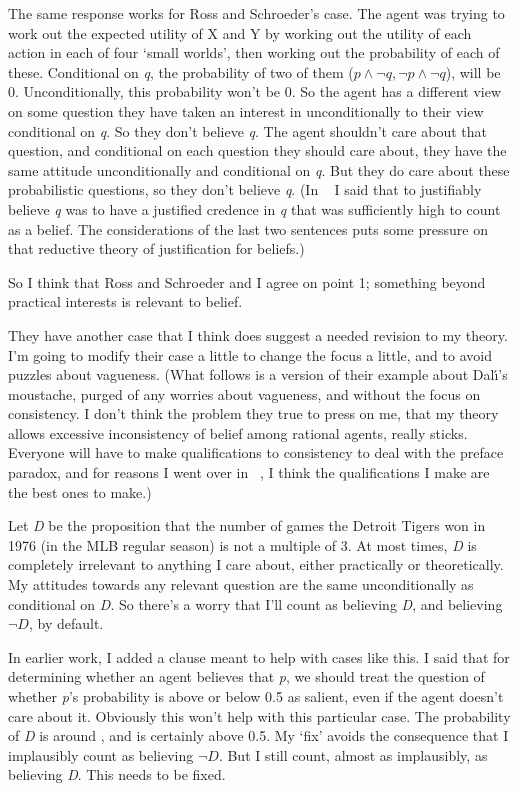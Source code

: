 The same response works for Ross and Schroeder's case. The agent was trying to work out the expected utility of X and Y by working out the utility of each action in each of four `small worlds', then working out the probability of each of these. Conditional on \emph{q}, the probability of two of them ($p \wedge \neg q, \neg p \wedge \neg q$), will be 0. Unconditionally, this probability won't be 0. So the agent has a different view on some question they have taken an interest in unconditionally to their view conditional on \emph{q}. So they don't believe \emph{q}. The agent shouldn't care about that question, and conditional on each question they should care about, they have the same attitude unconditionally and conditional on \emph{q}. But they do care about these probabilistic questions, so they don't believe \emph{q}. (In ~\citep{Weatherson2005-WEACWD} I said that to justifiably believe \emph{q} was to have a justified credence in \emph{q} that was sufficiently high to count as a belief. The considerations of the last two sentences puts some pressure on that reductive theory of justification for beliefs.)

So I think that Ross and Schroeder and I agree on point 1; something beyond practical interests is relevant to belief.

They have another case that I think does suggest a needed revision to my theory. I'm going to modify their case a little to change the focus a little, and to avoid puzzles about vagueness. (What follows is a version of their example about Dal\'\i's moustache, purged of any worries about vagueness, and without the focus on consistency. I don't think the problem they true to press on me, that my theory allows excessive inconsistency of belief among rational agents, really sticks. Everyone will have to make qualifications to consistency to deal with the preface paradox, and for reasons I went over in ~\citep{Weatherson2005-WEACWD}, I think the qualifications I make are the best ones to make.)

Let \emph{D} be the proposition that the number of games the Detroit Tigers won in 1976 (in the MLB regular season) is not a multiple of 3. At most times, \emph{D} is completely irrelevant to anything I care about, either practically or theoretically. My attitudes towards any relevant question are the same unconditionally as conditional on \emph{D}. So there's a worry that I'll count as believing \emph{D}, and believing $\neg D$, by default.

In earlier work, I added a clause meant to help with cases like this. I said that for determining whether an agent believes that \emph{p}, we should treat the question of whether \emph{p}'s probability is above or below 0.5 as salient, even if the agent doesn't care about it. Obviously this won't help with this particular case. The probability of \emph{D} is around , and is certainly above 0.5. My `fix' avoids the consequence that I implausibly count as believing $\neg D$. But I still count, almost as implausibly, as believing \emph{D}. This needs to be fixed.

